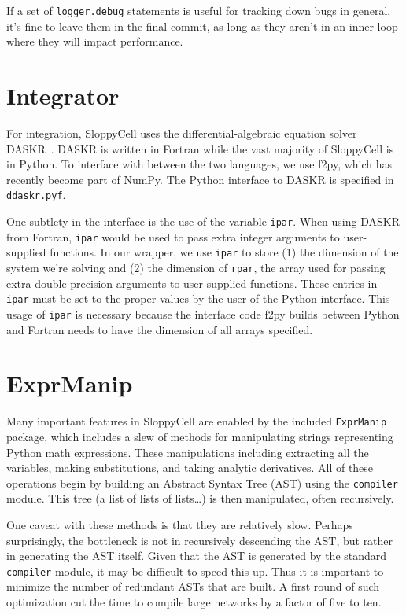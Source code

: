 \documentclass[12pt]{article}
\makeatletter
\newcommand{\py}[1]{\lstinline[language=Python, showstringspaces=False]@#1@}
\newcommand{\shell}[1]{\lstinline[language=csh, showstringspaces=False]!#1!}
\makeatother
\begin{document}
If a set of \py{logger.debug} statements is useful for tracking down bugs in general, it's fine to leave them in the final commit, as long as they aren't in an inner loop where they will impact performance.

\section{Integrator}
For integration, SloppyCell uses the differential-algebraic equation solver DASKR~\cite{bib:Brown1994, bib:Brown1998}. 
DASKR is written in Fortran while the vast majority of SloppyCell is in Python.
To interface with between the two languages, we use f2py, which has recently become part of NumPy.
The Python interface to DASKR is specified in \shell{ddaskr.pyf}.

One subtlety in the interface is the use of the variable \py{ipar}. 
When using DASKR from Fortran, \py{ipar} would be used to pass extra integer arguments to user-supplied functions.
In our wrapper, we use \py{ipar} to store (1) the dimension of the system we're solving and (2) the dimension of \py{rpar}, the array used for passing extra double precision arguments to user-supplied functions.
These entries in \py{ipar} must be set to the proper values by the user of the Python interface.
This usage of \py{ipar} is necessary because the interface code f2py builds between Python and Fortran needs to have the dimension of all arrays specified.

\section{ExprManip}\label{sec:exprmanip}
Many important features in SloppyCell are enabled by the included \py{ExprManip} package, which includes a slew of methods for manipulating strings representing Python math expressions.
These manipulations including extracting all the variables, making substitutions, and taking analytic derivatives.
All of these operations begin by building an Abstract Syntax Tree (AST) using the \py{compiler} module.
This tree (a list of lists of lists\dots) is then manipulated, often recursively.

One caveat with these methods is that they are relatively slow.
Perhaps surprisingly, the bottleneck is not in recursively descending the AST, but rather in generating the AST itself.
Given that the AST is generated by the standard \py{compiler} module, it may be difficult to speed this up.
Thus it is important to minimize the number of redundant ASTs that are built.
A first round of such optimization cut the time to compile large networks by a factor of five to ten.
\end{document}
